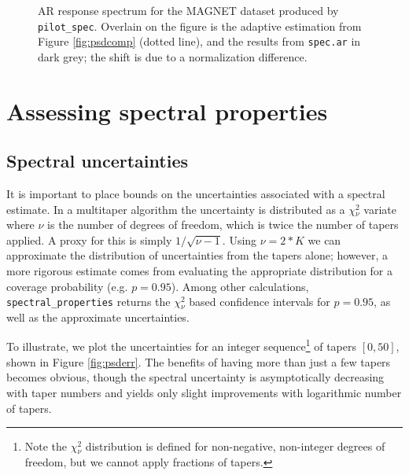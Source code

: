\documentclass[10pt]{article}\usepackage[]{graphicx}\usepackage[]{color}
\newenvironment{knitrout}{}{} %
\newcommand{\Rcmd}[1]{\texttt{#1}}
\begin{document}
\begin{figure}[h!]
\begin{center}
\begin{knitrout}
\end{knitrout}
\caption{AR response spectrum for the MAGNET dataset produced by 
\Rcmd{pilot\_spec}. Overlain on the figure is the adaptive estimation 
from Figure \ref{fig:psdcomp} (dotted line),
and the results from \Rcmd{spec.ar} in dark grey; the shift is due to a
normalization difference.}
\label{fig:arspecvar}
\end{center}
\end{figure}

\section{Assessing spectral properties}
\subsection{Spectral uncertainties}
It is important to place bounds on the uncertainties associated
with a spectral estimate.
In a multitaper algorithm the uncertainty is distributed as
a $\chi{}_{\nu}^2$ variate where $\nu$ is
the number of degrees of freedom, which is twice the
number of tapers applied.
A proxy for this is simply $1/\sqrt{\nu - 1}$.
Using $\nu = 2*K$ we can approximate the distribution
of uncertainties from the tapers alone; however, a more
rigorous estimate comes from evaluating the appropriate 
distribution  for a coverage probability (e.g. $p=0.95$).
Among other calculations, \Rcmd{spectral\_properties} returns the 
$\chi{}_{\nu}^2$ based confidence intervals for $p=0.95$, as well as the
approximate uncertainties.  

To illustrate, we 
plot the uncertainties for an integer sequence\footnote{
Note the $\chi{}_{\nu}^2$ distribution is defined for non-negative,
non-integer degrees of freedom, but we cannot apply
fractions of tapers.} of tapers $[0, 50]$, shown in
Figure \ref{fig:psderr}.  The benefits of having more than just
a few tapers becomes obvious, though the spectral uncertainty
is asymptotically decreasing with taper numbers and yields
only slight improvements with logarithmic number of tapers.
\end{document}
